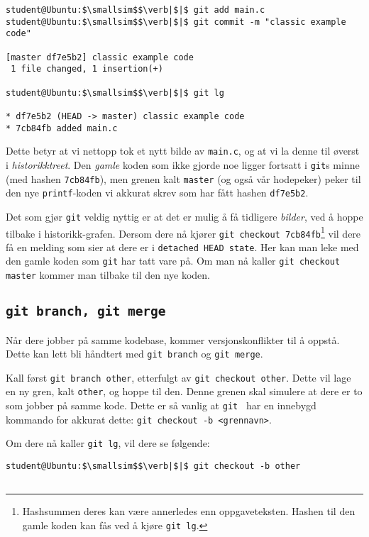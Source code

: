 \begin{alphasection}
\begin{lstlisting}[mathescape=true]
student@Ubuntu:$\smallsim$$\verb|$|$ git add main.c
student@Ubuntu:$\smallsim$$\verb|$|$ git commit -m "classic example code"

[master df7e5b2] classic example code
 1 file changed, 1 insertion(+)

student@Ubuntu:$\smallsim$$\verb|$|$ git lg

* df7e5b2 (HEAD -> master) classic example code
* 7cb84fb added main.c
\end{lstlisting}


Dette betyr at vi nettopp tok et nytt bilde av \verb|main.c|, og at vi la denne
til øverst i \textit{historikktreet}. Den \textit{gamle} koden som ikke gjorde noe ligger
fortsatt i \verb|git|s minne (med hashen \verb|7cb84fb|), men grenen kalt \verb|master| (og også vår hodepeker)
peker til den nye \verb|printf|-koden vi akkurat skrev som har fått hashen \verb|df7e5b2|.

Det som gjør \verb|git| veldig nyttig er at det er mulig å få tidligere \textit{bilder}, ved å hoppe tilbake i historikk-grafen. Dersom dere nå kjører \verb|git checkout 7cb84fb|\footnote{Hashsummen deres kan være annerledes enn oppgaveteksten. Hashen til den gamle koden kan fås ved å kjøre \texttt{git lg}.} vil dere få en melding som sier at dere er i \verb|detached HEAD state|. Her kan man leke med den gamle koden som \verb|git| har tatt vare på. Om man nå kaller \verb|git checkout master| kommer man tilbake til den nye koden.


\subsection{\texttt{git branch, git merge}}

Når dere jobber på samme kodebase, kommer versjonskonflikter til å oppstå. Dette kan lett bli håndtert med \verb|git branch| og \verb|git merge|.

Kall først \verb|git branch other|, etterfulgt av \verb|git checkout other|. Dette vil lage en ny gren, kalt \verb|other|, og hoppe til den. Denne grenen skal simulere at dere er to som jobber på samme kode. Dette er så vanlig at \verb|git | har en innebygd kommando for akkurat dette: \verb|git checkout -b <grennavn>|.

Om dere nå kaller \verb|git lg|, vil dere se følgende:

\begin{lstlisting}[mathescape=true]
student@Ubuntu:$\smallsim$$\verb|$|$ git checkout -b other


\end{lstlisting}
\end{alphasection}
